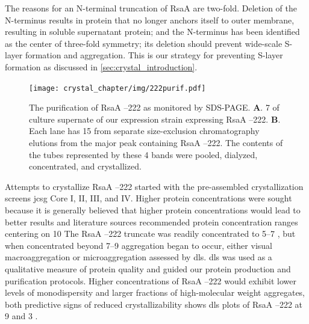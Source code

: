 The reasons for an N-terminal truncation of RsaA are two-fold. Deletion
of the N-terminus results in protein that no longer anchors itself to
outer membrane, resulting in soluble supernatant protein; and the
N-terminus has been identified as the center of three-fold symmetry; its
deletion should prevent wide-scale \ac{S-layer} formation and aggregation. This is our strategy for preventing \ac{S-layer} formation as discussed in \cref{sec:crystal_introduction}.

\begin{figure}[htb]
  	\begin{center}
   		\texttt{[image: crystal\_chapter/img/222purif.pdf]}
   	\end{center}
   	\caption[Purification of RsaA --222 shown by \ac{SDS-PAGE}]{
      The purification of RsaA --222 as monitored by \ac{SDS-PAGE}.
      \textbf{A}. 7 \microlitre{} of culture supernate of our \caulobacter{}
      expression strain expressing RsaA --222. \textbf{B}. Each lane has
      15 \microlitre{} from separate  size-exclusion chromatography elutions
      from the major peak containing RsaA --222. The contents of the tubes represented by
      these 4 bands were pooled, dialyzed, concentrated, and crystallized.
}
   	\label{fig:222purif}
\end{figure}   

 Attempts to crystallize RsaA --222 started with the pre-assembled
 crystallization screens \ac{jcsg} Core I, II, III, and IV. Higher protein
 concentrations were sought because it is generally believed that higher protein
 concentrations would lead to better results and literature sources recommended
 protein concentration ranges centering on 10
 \mgperml{}  The RsaA --222 truncate was
 readily concentrated to 5--7 \mgperml, but when concentrated beyond 7--9
 \mgperml aggregation began to occur, either visual macroaggregation or
 microaggregation assessed by \ac{dls}. \Ac{dls} was used as a qualitative
 measure of protein quality and guided our protein production and  purification protocols.  Higher concentrations of RsaA --222 would exhibit lower levels of monodispersity and larger fractions of high-molecular weight aggregates, both predictive signs of reduced crystallizability  shows \ac{dls} plots of RsaA --222 at 9 \mgperml and 3 \mgperml.

